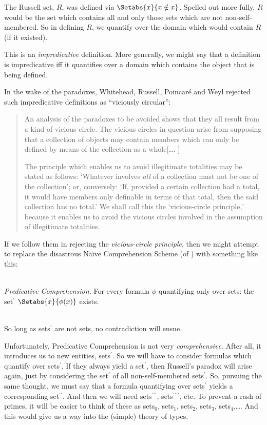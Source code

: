 \documentclass[../../../include/open-logic-section]{subfiles}
\begin{document}


The Russell set, $R$, was defined via $\Setabs{x}{x \notin
x}$. Spelled out more fully, $R$ would be the set which contains all
and only those sets which are not non-self-membered. So in defining
$R$, we quantify over the domain which would contain $R$ (if it
existed).

This is an \emph{impredicative} definition. More generally, we might
say that a definition is impredicative iff it quantifies over a domain
which contains the object that is being defined.  
	
In the wake of the paradoxes, Whitehead, Russell, Poincar\'{e} and
Weyl rejected such impredicative definitions as ``viciously
circular'':
\begin{quote}
	An analysis of the paradoxes to be avoided shows that they all
	result from a kind of vicious circle. The vicious circles in
	question arise from supposing that a collection of objects may
	contain members which can only be defined by means of the
	collection as a whole[\ldots. \textparagraph]

	The principle which enables us to avoid illegitimate totalities
	may be stated as follows: `Whatever involves \emph{all} of a
	collection must not be one of the collection'; or, conversely:
	`If, provided a certain collection had a total, it would have
	members only definable in terms of that total, then the said
	collection has no total.' We shall call this the `vicious-circle
	principle,' because it enables us to avoid the vicious circles
	involved in the assumption of illegitimate totalities.
	\citep[p.~37]{WhiteheadRussell1910}
\end{quote}
If we follow them in rejecting the \emph{vicious-circle principle},
then we might attempt to replace the disastrous Na\"{i}ve
Comprehension Scheme (of ) with something like this: 

	\
	\\\emph{Predicative Comprehension.} For every formula $\phi$ quantifying only over sets: the set$^\prime$ $\Setabs{x}{\phi(x)}$ exists.
	
\
\\So long as sets$^{\prime}$ are not sets, no contradiction will ensue.  

Unfortunately, Predicative Comprehension is not very
\emph{comprehensive}. After all, it introduces us to new entities,
sets$^\prime$. So we will have to consider formulas which quantify
over sets$^\prime$. If they always yield a set$^\prime$, then
Russell's paradox will arise again, just by considering the
set$^\prime$ of all non-self-membered sets$^\prime$. So, pursuing the
same thought, we must say that a formula quantifying over
sets$^\prime$ yields a corresponding set$^{\prime\prime}$. And then we
will need sets$^{\prime\prime\prime}$,
sets$^{\prime\prime\prime\prime}$, etc. To prevent a rash of primes,
it will be easier to think of these as sets$_0$, sets$_1$, sets$_2$,
sets$_3$, sets$_4$,\ldots. And this would give us a way into the
(simple) theory of types. 
\end{document}
